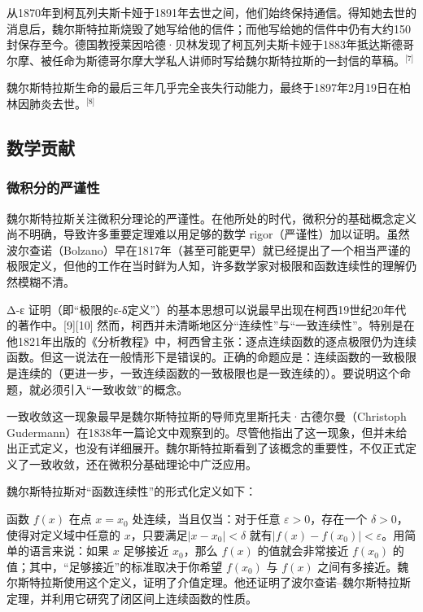从1870年到柯瓦列夫斯卡娅于1891年去世之间，他们始终保持通信。得知她去世的消息后，魏尔斯特拉斯烧毁了她写给他的信件；而他写给她的信件中仍有大约150封保存至今。德国教授莱因哈德·贝林发现了柯瓦列夫斯卡娅于1883年抵达斯德哥尔摩、被任命为斯德哥尔摩大学私人讲师时写给魏尔斯特拉斯的一封信的草稿。\(^\text{[7]}\)

魏尔斯特拉斯生命的最后三年几乎完全丧失行动能力，最终于1897年2月19日在柏林因肺炎去世。\(^\text{[8]}\)
\subsection{数学贡献}
\subsubsection{微积分的严谨性}
魏尔斯特拉斯关注微积分理论的严谨性。在他所处的时代，微积分的基础概念定义尚不明确，导致许多重要定理难以用足够的数学 rigor（严谨性）加以证明。虽然波尔查诺（Bolzano）早在1817年（甚至可能更早）就已经提出了一个相当严谨的极限定义，但他的工作在当时鲜为人知，许多数学家对极限和函数连续性的理解仍然模糊不清。

Δ-ε 证明（即“极限的ε-δ定义”）的基本思想可以说最早出现在柯西19世纪20年代的著作中。[9][10] 然而，柯西并未清晰地区分“连续性”与“一致连续性”。特别是在他1821年出版的《分析教程》中，柯西曾主张：逐点连续函数的逐点极限仍为连续函数。但这一说法在一般情形下是错误的。正确的命题应是：连续函数的一致极限是连续的（更进一步，一致连续函数的一致极限也是一致连续的）。要说明这个命题，就必须引入“一致收敛”的概念。

一致收敛这一现象最早是魏尔斯特拉斯的导师克里斯托夫·古德尔曼（Christoph Gudermann）在1838年一篇论文中观察到的。尽管他指出了这一现象，但并未给出正式定义，也没有详细展开。魏尔斯特拉斯看到了该概念的重要性，不仅正式定义了一致收敛，还在微积分基础理论中广泛应用。

魏尔斯特拉斯对“函数连续性”的形式化定义如下：

函数 $f(x)$ 在点 $x = x_0$ 处连续，当且仅当：对于任意 $\varepsilon > 0$，存在一个 $\delta > 0$，使得对定义域中任意的 $x$，只要满足$|x - x_0| < \delta$
就有$|f(x) - f(x_0)| < \varepsilon$。用简单的语言来说：如果 $x$ 足够接近 $x_0$，那么 $f(x)$ 的值就会非常接近 $f(x_0)$ 的值；其中，“足够接近”的标准取决于你希望 $f(x_0)$ 与 $f(x)$ 之间有多接近。魏尔斯特拉斯使用这个定义，证明了介值定理。他还证明了波尔查诺–魏尔斯特拉斯定理，并利用它研究了闭区间上连续函数的性质。

